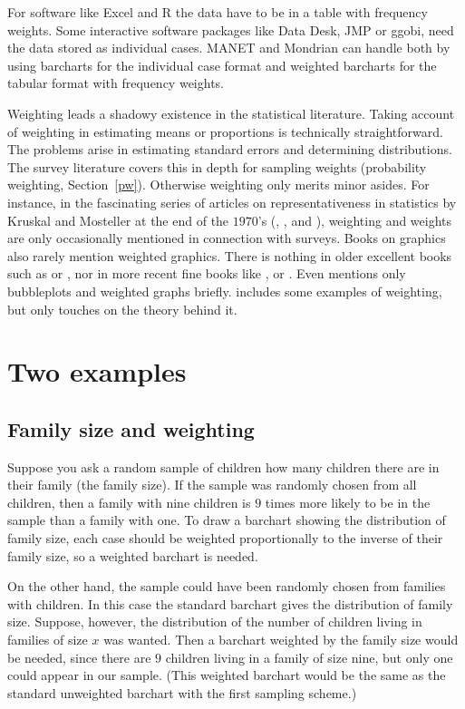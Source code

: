 \documentclass{svmult}
\begin{document}
For software like Excel and R the data have to be in a table with frequency weights. Some interactive software packages like Data Desk, JMP or ggobi, need the data stored as individual cases. MANET and Mondrian can handle both by using barcharts for the individual case format and weighted barcharts for the tabular format with frequency weights.

Weighting leads a shadowy existence in the statistical literature. Taking account of weighting in estimating means or proportions is technically straightforward. The problems arise in estimating standard errors and determining distributions. The survey literature covers this in depth for sampling weights (probability weighting, Section~\ref{pw}). Otherwise weighting only merits minor asides. For instance, in the fascinating series of articles on representativeness in statistics by Kruskal and Mosteller at the end of the $1970$'s (\cite{kruskal1:1979}, \cite{kruskal2:1979}, \cite{kruskal3:1979} and \cite{kruskal:1980}), weighting and weights are only occasionally mentioned in connection with surveys. Books on graphics also rarely mention weighted graphics. There is nothing in older excellent books such as \cite{chambers:1983} or \cite{cleveland:1994}, nor in more recent fine books like \cite{Murrell:2005}, \cite{young:2006} or \cite{cook:2007}. Even \cite{wilkinson:2005} mentions only bubbleplots and weighted graphs briefly. \cite{unwin:2006} includes some examples of weighting, but only touches on the theory behind it.

\section{Two examples}
\label{exs}

\subsection{Family size and weighting}
\label{family}
Suppose you ask a random sample of children how many children there are in their family (the family size).  If the sample was randomly chosen from all children, then a family with nine children is $9$ times more likely to be in the sample than a family with one.  To draw a barchart showing the distribution of family size, each case should be weighted proportionally to the inverse of their family size, so a weighted barchart is needed.

On the other hand, the sample could have been randomly chosen from families with children.  In this case the standard barchart gives the distribution of family size.  Suppose, however, the distribution of the number of children living in families of size $x$ was wanted.  Then a barchart weighted by the family size would be needed, since there are $9$ children living in a family of size nine, but only one could appear in our sample.  (This weighted barchart would be the same as the standard unweighted barchart with the first sampling scheme.)
\end{document}
